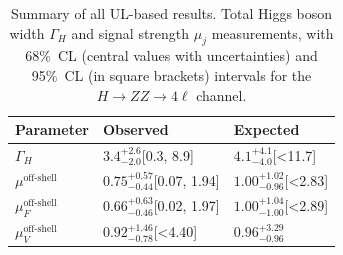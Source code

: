 \begin{table}[!thb]
    \centering
    \renewcommand{\arraystretch}{1.5}
    \begin{tabular}{lll}
        Parameter & Observed & Expected \\ \hline
$\Gamma_H$ & $3.4^{+2.6}_{-2.0}$[0.3, 8.9] & $4.1^{+4.1}_{-4.0}$[<11.7] \\ 
$\mu^\text{off-shell}$ & $0.75^{+0.57}_{-0.44}$[0.07, 1.94] & $1.00^{+1.02}_{-0.96}$[<2.83] \\ 
$\mu_F^\text{off-shell}$ & $0.66^{+0.63}_{-0.46}$[0.02, 1.97] & $1.00^{+1.04}_{-1.00}$[<2.89] \\
$\mu_V^\text{off-shell}$ & $0.92^{+1.46}_{-0.78}$[<4.40] & $0.96^{+3.29}_{-0.96}$ \\ 
    \end{tabular}
    \caption{Summary of all UL-based results. Total Higgs boson width $\Gamma_H$ and signal strength $\mu_j$ measurements, with 68\%~CL (central values with uncertainties) and 95\%~CL (in square brackets) intervals for the $H \to ZZ \to 4 \ell$ channel.}
    \label{table:widthoffshellUL}
\end{table}
